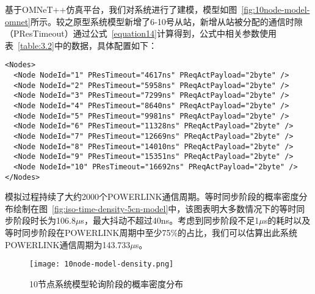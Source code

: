 基于OMNeT++仿真平台，我们对系统进行了建模，模型如图~\ref{fig:10node-model-omnet}所示。较之原型系统模型新增了6-10号从站，新增从站被分配的通信时隙（PResTimeout）通过公式~\ref{equation14}计算得到，公式中相关参数使用表~\ref{table:3.2}中的数据，具体配置如下：
\begin{lstlisting}
<Nodes>
  <Node NodeId="1" PResTimeout="4617ns" PReqActPayload="2byte" />
  <Node NodeId="2" PResTimeout="5958ns" PReqActPayload="2byte" />
  <Node NodeId="3" PResTimeout="7299ns" PReqActPayload="2byte" />
  <Node NodeId="4" PResTimeout="8640ns" PReqActPayload="2byte" />
  <Node NodeId="5" PResTimeout="9981ns" PReqActPayload="2byte" />
  <Node NodeId="6" PResTimeout="11328ns" PReqActPayload="2byte" />
  <Node NodeId="7" PResTimeout="12669ns" PReqActPayload="2byte" />
  <Node NodeId="8" PResTimeout="14010ns" PReqActPayload="2byte" />
  <Node NodeId="9" PResTimeout="15351ns" PReqActPayload="2byte" />
  <Node NodeId="10" PResTimeout="16692ns" PReqActPayload="2byte" />
</Nodes>
\end{lstlisting}

模拟过程持续了大约2000个POWERLINK通信周期。等时同步阶段的概率密度分布绘制在图~\ref{fig:iso-time-density-5cn-model}中，该图表明大多数情况下的等时同步阶段时长为106.8$\mu$s，最大抖动不超过40ns。考虑到同步阶段不足1$\mu$s的耗时以及等时同步阶段在POWERLINK周期中至少75\%的占比，我们可以估算出此系统POWERLINK通信周期为143.733$\mu$s。

\begin{figure}[!htb]
  \centering
  \texttt{[image: 10node-model-density.png]}
  \caption{10节点系统模型轮询阶段的概率密度分布}
  \label{fig:10node-model-density}
\end{figure}



